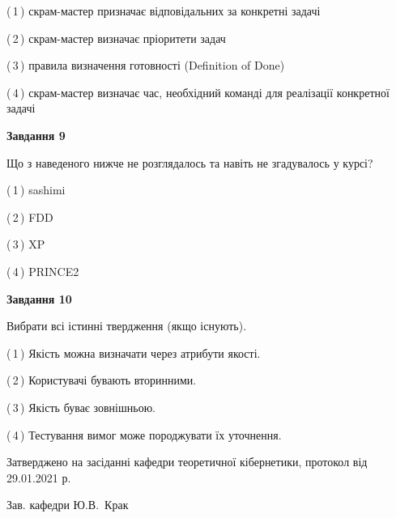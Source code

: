 \documentclass[10pt, ukrainian]{article}
\begin{document}
{\begin {large}
(\,1\,) скрам-мастер призначає відповідальних за конкретні задачі%



(\,2\,) скрам-мастер визначає пріоритети задач%



(\,3\,) правила визначення готовності (Definition of Done) %



(\,4\,) скрам-мастер визначає час, необхідний команді для реалізації конкретної задачі%


{\begin {center}\textbf{Завдання 9}\end {center}}\par
Що з наведеного нижче не розглядалось та навіть не згадувалось у курсі?\par
\vspace{2mm}



(\,1\,) sashimi%



(\,2\,) FDD%



(\,3\,) XP%



(\,4\,) PRINCE2%


{\begin {center}\textbf{Завдання 10}\end {center}}\par
Вибрати всі істинні твердження (якщо існують).\par
\vspace{2mm}



(\,1\,) Якість можна визначати через атрибути якості.%



(\,2\,) Користувачі бувають вторинними.%



(\,3\,) Якість буває зовнішньою.%



(\,4\,) Тестування вимог може породжувати їх уточнення.%



\end {large}}
{\vspace{5mm}\smallskip \begin {small} Затверджено на засіданні кафедри теоретичної кібернетики, протокол  від   29.01.2021 р.\par\smallskip\smallskip
{\parbox {6.5 cm}{Зав. кафедри \dotfill Ю.В.~Крак}} \end{small}}
\newpage
\end{document}

